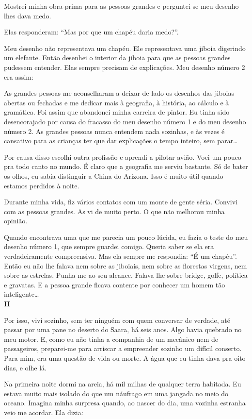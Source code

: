 \begin{Parallel}[p]{}{}
{Mostrei minha obra-prima para as pessoas grandes e perguntei se meu
desenho lhes dava medo.

Elas responderam: ``Mas por que um chapéu daria medo?''.

Meu desenho não representava um chapéu. Ele representava uma jiboia
digerindo um elefante. Então desenhei o interior da jiboia para que as
pessoas grandes pudessem entender. Elas sempre precisam de explicações.
Meu desenho número 2 era assim:

As grandes pessoas me aconselharam a deixar de lado os desenhos das
jiboias abertas ou fechadas e me dedicar mais à geografia, à história,
ao cálculo e à gramática. Foi assim que abandonei minha carreira de
pintor. Eu tinha sido desencorajado por causa do fracasso do meu desenho
número 1 e do meu desenho número 2. As grandes pessoas nunca entendem
nada sozinhas, e às vezes é cansativo para as crianças ter que dar
explicações o tempo inteiro, sem parar\ldots{}

Por causa disso escolhi outra profissão e aprendi a pilotar avião. Voei
um pouco pra todo canto no mundo. É claro que a geografia me serviu
bastante. Só de bater os olhos, eu sabia distinguir a China do Arizona.
Isso é muito útil quando estamos perdidos à noite.

Durante minha vida, fiz vários contatos com um monte de gente séria.
Convivi com as pessoas grandes. As vi de muito perto. O que não melhorou
minha opinião.

Quando encontrava uma que me parecia um pouco lúcida, eu fazia o teste
do meu desenho número 1, que sempre guardei comigo. Queria saber se ela
era verdadeiramente compreensiva. Mas ela sempre me respondia: ``É um
chapéu''. Então eu não lhe falava nem sobre as jiboiais, nem sobre as
florestas virgens, nem sobre as estrelas. Punha-me ao seu alcance.
Falava-lhe sobre bridge, golfe, política e gravatas. E a pessoa grande
ficava contente por conhecer um homem tão inteligente\ldots{}\\

\textbf{II}

Por isso, vivi sozinho, sem ter ninguém com quem conversar de verdade,
até passar por uma pane no deserto do Saara, há seis anos. Algo havia
quebrado no meu motor. E, como eu não tinha a companhia de um mecânico
nem de passageiros, preparei-me para arriscar a empreender sozinho um
difícil conserto. Para mim, era uma questão de vida ou morte. A água que
eu tinha dava pra oito dias, e olhe lá.

Na primeira noite dormi na areia, há mil milhas de qualquer terra
habitada. Eu estava muito mais isolado do que um náufrago em uma jangada
no meio do oceano. Imagina minha surpresa quando, ao nascer do dia, uma
vozinha estranha veio me acordar. Ela dizia:

}
\end{Parallel}
